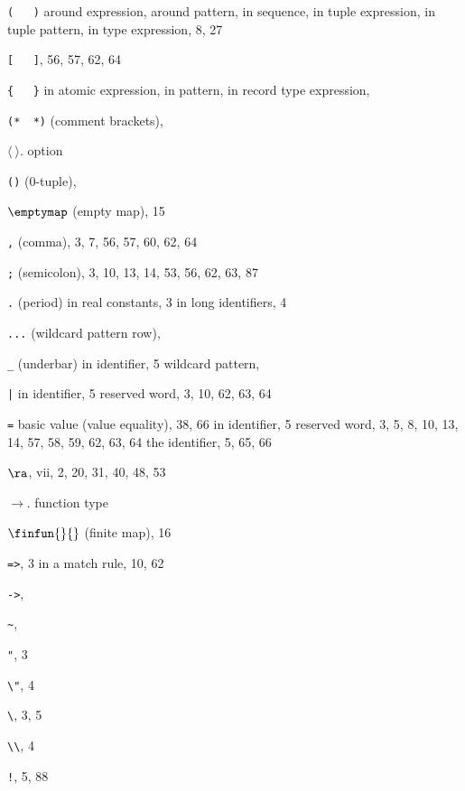 \begin{theindex}
\item \verb+(   )+
\subitem around expression, \parexprefs
\subitem around pattern, \parpatrefs
\subitem in sequence,  \sequenceexprefs
\subitem in tuple expression, \tupleexprefs
\subitem in tuple pattern, \tuplepatrefs
\subitem in type expression, 8, 27
\item \verb+[   ]+, 56, 57, 62, 64
\item \verb+{   }+
\subitem in atomic expression, \recordexprefs
\subitem in pattern, \recordpatrefs
\subitem in record type expression, \bracestyexprefs
\item \verb+(*  *)+ (comment brackets), \commentrefs
\item $\langle\ \rangle$. \see option 
\item \verb+()+ (0-tuple), \zerotuplerefs
\item $\emptymap$ (empty map), 15
\item \verb+,+ (comma), 3, 7, 56, 57, 60, 62, 64
\item \verb+;+ (semicolon), 3, 10, 13, 14, 53, 56, 62, 63, 87
\item \verb+.+ (period) 
\subitem in real constants, 3
\subitem in long identifiers, 4
\item \verb+...+ (wildcard pattern row), \dotdotdotrefs
\item \verb+_+ (underbar) 
\subitem in identifier, 5
\subitem wildcard pattern, \underscorewildrefs
\item \verb+|+
\subitem in identifier, 5
\subitem reserved word, 3, 10, 62, 63, 64
\item \verb+=+ 
\subitem basic value (value equality), 38, 66
\subitem in identifier, 5
\subitem reserved word, 3, 5, 8, 10, 13, 14, 57, 58, 59, 62, 63, 64
\subitem the identifier, 5, 65, 66
\item $\ra$, vii, 2, 20, 31, 40, 48, 53
\item $\rightarrow$. \see function type
\item $\finfun{}{}$ (finite map), 16
\item \verb+=>+, 3
\subitem in a match rule, 10, 62
\item \verb+->+, \funtyperefs
\item \verb+~+, \unaryminusrefs
\item \verb+"+, 3
\item \verb+\"+, 4
\item \verb+\+, 3, 5
\item \verb+\\+, 4
\item \verb+!+, 5, 88

\end{theindex}
